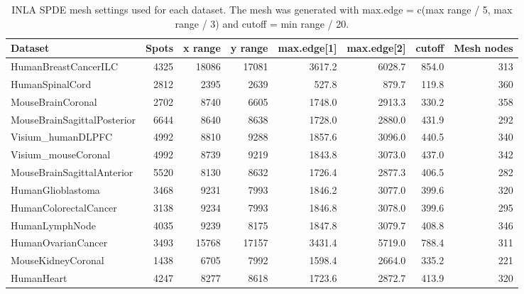 \begin{table}[htbp]
\centering
\caption{INLA SPDE mesh settings used for each dataset. The mesh was generated with max.edge = c(max range / 5, max range / 3) and cutoff = min range / 20.}
\label{tab:mesh-parameters}
\begin{tabular}{lrrrrrrr}
\toprule
Dataset & Spots & x range & y range & max.edge[1] & max.edge[2] & cutoff & Mesh nodes
 \\
\midrule
HumanBreastCancerILC & 4325 & 18086 & 17081 & 3617.2 & 6028.7 & 854.0 & 313
 \\
HumanSpinalCord & 2812 & 2395 & 2639 & 527.8 & 879.7 & 119.8 & 360
 \\
MouseBrainCoronal & 2702 & 8740 & 6605 & 1748.0 & 2913.3 & 330.2 & 358
 \\
MouseBrainSagittalPosterior & 6644 & 8640 & 8638 & 1728.0 & 2880.0 & 431.9 & 292
 \\
Visium\_humanDLPFC & 4992 & 8810 & 9288 & 1857.6 & 3096.0 & 440.5 & 340
 \\
Visium\_mouseCoronal & 4992 & 8739 & 9219 & 1843.8 & 3073.0 & 437.0 & 342
 \\
MouseBrainSagittalAnterior & 5520 & 8130 & 8632 & 1726.4 & 2877.3 & 406.5 & 282
 \\
HumanGlioblastoma & 3468 & 9231 & 7993 & 1846.2 & 3077.0 & 399.6 & 320
 \\
HumanColorectalCancer & 3138 & 9234 & 7993 & 1846.8 & 3078.0 & 399.6 & 295
 \\
HumanLymphNode & 4035 & 9239 & 8175 & 1847.8 & 3079.7 & 408.8 & 346
 \\
HumanOvarianCancer & 3493 & 15768 & 17157 & 3431.4 & 5719.0 & 788.4 & 311
 \\
MouseKidneyCoronal & 1438 & 6705 & 7992 & 1598.4 & 2664.0 & 335.2 & 221
 \\
HumanHeart & 4247 & 8277 & 8618 & 1723.6 & 2872.7 & 413.9 & 320
 \\
\bottomrule
\end{tabular}
\end{table}
